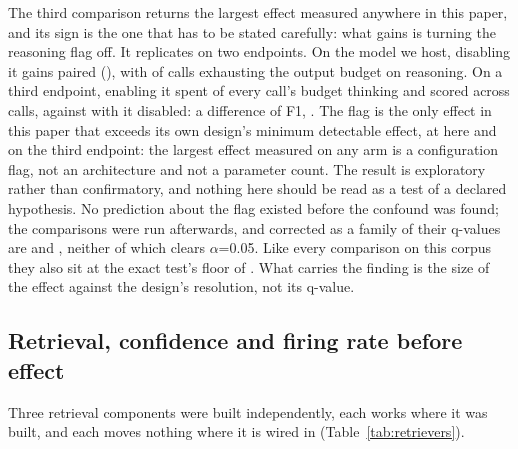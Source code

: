 The third comparison returns the largest effect measured anywhere in this paper, and its sign is the
one that has to be stated carefully: what gains is turning the reasoning flag off. It replicates on
two endpoints. On the model we host, disabling it gains  paired
(), with
 of  calls exhausting the output budget on
reasoning. On a third endpoint, enabling it spent  of every call's
budget thinking and scored  across  calls, against
 with it disabled: a difference of 
F1, . The flag is the
only effect in this paper that exceeds its own design's minimum detectable effect, at
 here and  on the third endpoint:
the largest effect measured on any arm is a configuration flag, not an architecture and not a
parameter count. The result is exploratory rather than confirmatory, and nothing here should be read as a test of a
declared hypothesis. No prediction about the flag existed before the confound was found; the
comparisons were run afterwards, and corrected as a family of  their q-values
are  and , neither of
which clears $\alpha$=0.05. Like every comparison on this corpus they also sit at the exact test's floor of
. What carries the finding is the size of the effect against the
design's resolution, not its q-value.

\subsection{Retrieval, confidence and firing rate before effect}\label{sec:mechanisms}

Three retrieval components were built independently, each works where it was built, and each moves
nothing where it is wired in (Table~\ref{tab:retrievers}).

